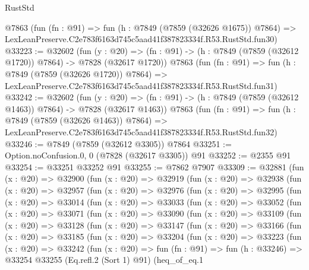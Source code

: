 \begin{lexlean}{RustStd}
\begin{coremodule}
    @7863
    (fun (fn : @91) =>
    fun (h : @7849 (@7859 (@32626 @1675)) @7864) =>
    LexLeanPreserve.C2e783f6163d745c5aad41f387823334f.R53.RustStd.fun30)
@33223 := @32602
    (fun (y : @20) =>
    (fn : @91) -> (h : @7849 (@7859 (@32612 @1720)) @7864) -> @7828 (@32617 @1720))
    @7863
    (fun (fn : @91) =>
    fun (h : @7849 (@7859 (@32626 @1720)) @7864) =>
    LexLeanPreserve.C2e783f6163d745c5aad41f387823334f.R53.RustStd.fun31)
@33242 := @32602
    (fun (y : @20) =>
    (fn : @91) -> (h : @7849 (@7859 (@32612 @1463)) @7864) -> @7828 (@32617 @1463))
    @7863
    (fun (fn : @91) =>
    fun (h : @7849 (@7859 (@32626 @1463)) @7864) =>
    LexLeanPreserve.C2e783f6163d745c5aad41f387823334f.R53.RustStd.fun32)
@33246 := @7849 (@7859 (@32612 @3305)) @7864
@33251 := Option.noConfusion.{0, 0} (@7828 (@32617 @3305)) @91
@33252 := @2355 @91
@33254 := @33251 @33252 @91
@33255 := @7862 @7907
@33309 := @32881
    (fun (x : @20) =>
    @32900
      (fun (x : @20) =>
      @32919
        (fun (x : @20) =>
        @32938
          (fun (x : @20) =>
          @32957
            (fun (x : @20) =>
            @32976
              (fun (x : @20) =>
              @32995
                (fun (x : @20) =>
                @33014
                  (fun (x : @20) =>
                  @33033
                    (fun (x : @20) =>
                    @33052
                      (fun (x : @20) =>
                      @33071
                        (fun (x : @20) =>
                        @33090
                          (fun (x : @20) =>
                          @33109
                            (fun (x : @20) =>
                            @33128
                              (fun (x : @20) =>
                              @33147
                                (fun (x : @20) =>
                                @33166
                                  (fun (x : @20) =>
                                  @33185
                                    (fun (x : @20) =>
                                    @33204
                                      (fun (x : @20) =>
                                      @33223
                                        (fun (x : @20) =>
                                        @33242
                                          (fun (x : @20) =>
                                          fun (fn : @91) =>
                                          fun (h : @33246) =>
                                          @33254
                                            @33255
                                            (Eq.refl.{2} (Sort 1) @91)
                                            (heq_of_eq.{1}

\end{coremodule}
\end{lexlean}
